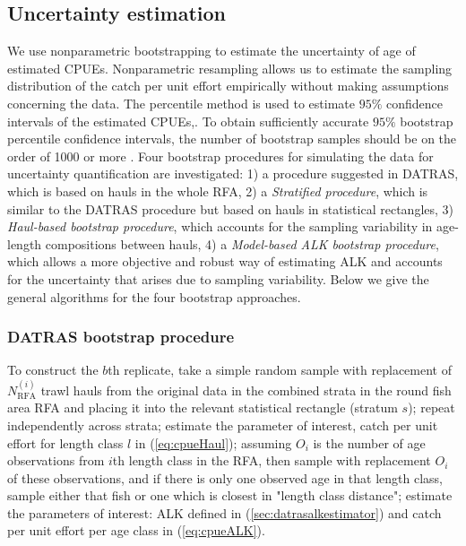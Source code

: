 \documentclass[a4paper 12pt]{article}
\numberwithin{equation}{section}
\begin{document}
\subsection{Uncertainty estimation}
\label{sec:uncertaintyestimation}

We use nonparametric bootstrapping to estimate the uncertainty of age of estimated CPUEs. Nonparametric resampling allows us to estimate the sampling distribution of the catch per unit effort empirically without making assumptions concerning the data. The percentile method is used to estimate $95\%$ confidence intervals of the estimated CPUEs,. To obtain sufficiently accurate $95\%$ bootstrap percentile confidence intervals, the number of bootstrap samples should  be on the order of 1000 or more \citep[see][]{carpenter2000bootstrap}. Four bootstrap procedures for simulating the data for uncertainty quantification are investigated: 1) a procedure suggested in DATRAS, which is based on hauls in the whole RFA, 2) a \textit{Stratified procedure}, which is similar to the DATRAS procedure but based on hauls in statistical rectangles, 3)  \textit{Haul-based bootstrap procedure}, which accounts for the sampling variability in age-length compositions between hauls, 4) a \textit{Model-based ALK bootstrap procedure}, which allows a more objective and robust way of estimating ALK and accounts for the uncertainty that arises due to sampling variability. Below we give the general algorithms for the four bootstrap approaches.
\subsubsection{DATRAS bootstrap procedure} 
\label{datrasboot} 
To construct the $b$th replicate, take a simple random sample with replacement of $N_{\text{RFA}}^{(i)}$ trawl hauls from the original data in the combined strata in the round fish area RFA and placing it into the relevant statistical rectangle (stratum $s$); repeat independently across strata; estimate the parameter of interest, catch per unit effort for length class $l$ in (\ref{eq:cpueHaul}); assuming $O_i$ is the number of age observations from $i$th length class in the RFA, then sample with replacement $O_i$ of these observations, and if there is only one observed age in that length class, sample either that fish or one which is closest in "length class distance"; estimate the parameters of interest: ALK defined in (\ref{sec:datrasalkestimator}) and catch per unit effort per age class in (\ref{eq:cpueALK}). 
\end{document}
